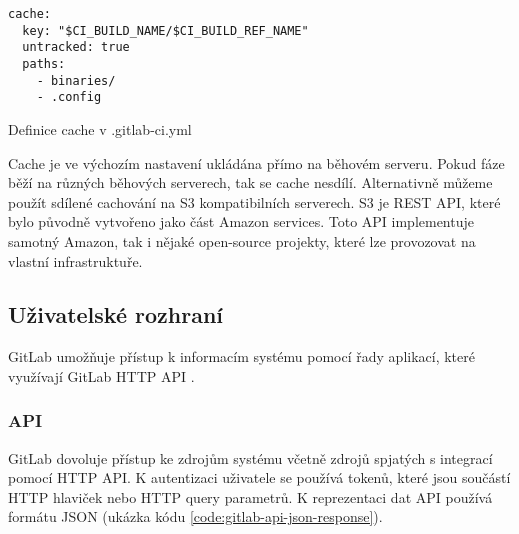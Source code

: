 \begin{listing}[ht]
\begin{verbatim}
cache:
  key: "$CI_BUILD_NAME/$CI_BUILD_REF_NAME"
  untracked: true
  paths:
    - binaries/
    - .config
\end{verbatim}
\caption{Definice cache v .gitlab-ci.yml}
\end{listing}


Cache je ve výchozím nastavení ukládána přímo na běhovém serveru.
Pokud fáze běží na různých běhových serverech, tak se cache nesdílí.
Alternativně můžeme použít sdílené cachování na S3 kompatibilních serverech.
S3 je REST API, které bylo původně vytvořeno jako část Amazon services.
Toto API implementuje samotný Amazon, tak i nějaké open-source projekty, které lze provozovat na vlastní infrastruktuře.


\subsection{Uživatelské rozhraní}

GitLab umožňuje přístup k informacím systému pomocí řady aplikací, které využívají GitLab HTTP API \cite{gitlab_api}.

\subsubsection{API}

GitLab dovoluje přístup ke zdrojům systému včetně zdrojů spjatých s integrací pomocí HTTP API.
K autentizaci uživatele se používá tokenů, které jsou součástí HTTP hlaviček nebo HTTP query parametrů.
K reprezentaci dat API používá formátu JSON (ukázka kódu \ref{code:gitlab-api-json-response}).

